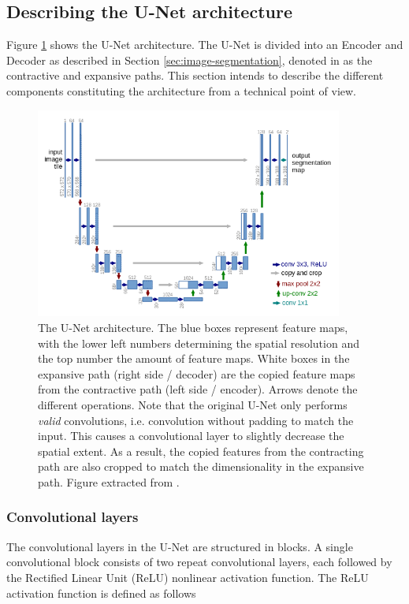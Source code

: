 \documentclass[../main/thesis.tex]{subfiles}
\begin{document}
\subsection{Describing the U-Net architecture}
\label{sec:unet}
Figure \ref{fig:unet-overview} shows the U-Net architecture. The U-Net is divided into an Encoder and Decoder as described in Section \ref{sec:image-segmentation}, denoted in \citet{Ronneberger2015} as the contractive and expansive paths. This section intends to describe the different components constituting the architecture from a technical point of view. 

\begin{figure}
    \centering
    \includegraphics[width=0.9\textwidth]{unet_screenshot}
    \caption{\label{fig:unet-overview}The U-Net architecture. The blue boxes represent feature maps, with the lower left numbers determining the spatial resolution and the top number the amount of feature maps. White boxes in the expansive path (right side / decoder) are the copied feature maps from the contractive path (left side / encoder). Arrows denote the different operations. Note that the original U-Net only performs \textit{valid} convolutions, i.e. convolution without padding to match the input. This causes a convolutional layer to slightly decrease the spatial extent. As a result, the copied features from the contracting path are also cropped to match the dimensionality in the expansive path. Figure extracted from \protect\citet{Ronneberger2015}.}
\end{figure}

\subsubsection{Convolutional layers}
The convolutional layers in the U-Net are structured in blocks. A single convolutional block consists of two repeat convolutional layers, each followed by the Rectified Linear Unit (ReLU) \citep{Nair2010} nonlinear activation function. The ReLU activation function is defined as follows
\end{document}
